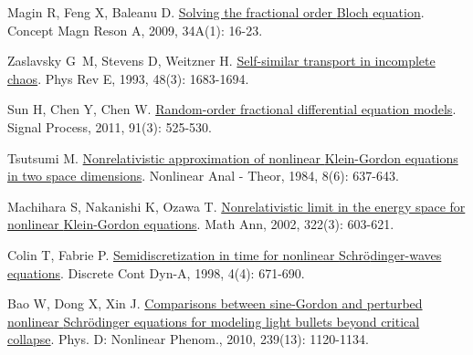 \begin{thebibliography}{79}
    Magin R, Feng X, Baleanu D.
    \newblock \href{https://onlinelibrary.wiley.com/doi/10.1002/cmr.a.20129}{Solving the fractional order {{Bloch}} equation}\allowbreak[J].
    \newblock Concept Magn Reson A, 2009, 34A\allowbreak (1): 16-23.
    
    Zaslavsky G~M, Stevens D, Weitzner H.
    \newblock \href{https://link.aps.org/doi/10.1103/PhysRevE.48.1683}{Self-similar transport in incomplete chaos}\allowbreak[J].
    \newblock Phys Rev E, 1993, 48\allowbreak (3): 1683-1694.
    
    Sun H, Chen Y, Chen W.
    \newblock \href{https://linkinghub.elsevier.com/retrieve/pii/S0165168410000447}{Random-order fractional differential equation models}\allowbreak[J].
    \newblock Signal Process, 2011, 91\allowbreak (3): 525-530.
    
    Tsutsumi M.
    \newblock \href{https://www.sciencedirect.com/science/article/pii/0362546X84900087}{Nonrelativistic approximation of nonlinear {{Klein-Gordon}} equations in two space dimensions}\allowbreak[J].
    \newblock Nonlinear Anal - Theor, 1984, 8\allowbreak (6): 637-643.

    Machihara S, Nakanishi K, Ozawa T.
    \newblock \href{http://link.springer.com/10.1007/s002080200008}{Nonrelativistic limit in the energy space for nonlinear {{Klein-Gordon}} equations}\allowbreak[J].
    \newblock Math Ann, 2002, 322\allowbreak (3): 603-621.
    
    Colin T, Fabrie P.
    \newblock \href{https://www.aimsciences.org/en/article/doi/10.3934/dcds.1998.4.671}{Semidiscretization in time for nonlinear {{Schr{\"o}dinger-waves}} equations}\allowbreak[J].
    \newblock Discrete Cont Dyn-A, 1998, 4\allowbreak (4): 671-690.
    
    Bao W, Dong X, Xin J.
    \newblock \href{https://linkinghub.elsevier.com/retrieve/pii/S0167278910000965}{Comparisons between sine-{{Gordon}} and perturbed nonlinear {{Schr{\"o}dinger}} equations for modeling light bullets beyond critical collapse}\allowbreak[J].
    \newblock Phys. D: Nonlinear Phenom., 2010, 239\allowbreak (13): 1120-1134.
    

\end{thebibliography}
